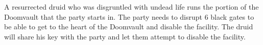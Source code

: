 A resurrected druid who was disgruntled with undead life runs the portion of the Doomvault that the party starts in.
The party needs to disrupt 6 black gates to be able to get to the heart of the Doomvault and disable the facility.
The druid will share his key with the party and let them attempt to disable the facility.
